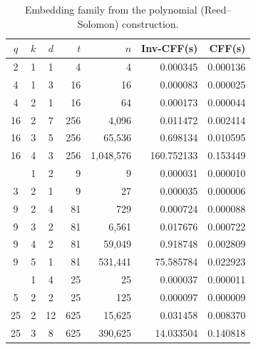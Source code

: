 
\begin{table}[htbp]
  \centering
  \begin{tabular}{cccrrrr}
  \toprule
  $q$ & $k$ & $d$ & $t$ & $n$ & \textbf{Inv-CFF(s)} & \textbf{CFF(s)} \\
  \midrule
  2 & 1 & 1 & 4 & 4 & 0.000345 & 0.000136 \\
  4 & 1 & 3 & 16 & 16 & 0.000083 & 0.000025 \\
  4 & 2 & 1 & 16 & 64 & 0.000173 & 0.000044 \\
  16 & 2 & 7 & 256 & 4{,}096 & 0.011472 & 0.002414 \\
  16 & 3 & 5 & 256 & 65{,}536 & 0.698134 & 0.010595 \\
  16 & 4 & 3 & 256 & 1{,}048{,}576 & 160.752133 & 0.153449 \\
  \addlinespace
  3 & 1 & 2 & 9 & 9 & 0.000031 & 0.000010 \\
  3 & 2 & 1 & 9 & 27 & 0.000035 & 0.000006 \\
  9 & 2 & 4 & 81 & 729 & 0.000724 & 0.000088 \\
  9 & 3 & 2 & 81 & 6{,}561 & 0.017676 & 0.000722 \\
  9 & 4 & 2 & 81 & 59{,}049 & 0.918748 & 0.002809 \\
  9 & 5 & 1 & 81 & 531{,}441 & 75.585784 & 0.022923 \\
  \addlinespace
  5 & 1 & 4 & 25 & 25 & 0.000037 & 0.000011 \\
  5 & 2 & 2 & 25 & 125 & 0.000097 & 0.000009 \\
  25 & 2 & 12 & 625 & 15{,}625 & 0.031458 & 0.008370 \\
  25 & 3 & 8 & 625 & 390{,}625 & 14.033504 & 0.140818 \\
  \bottomrule
  \end{tabular}
  \caption{Embedding family from the polynomial (Reed--Solomon) construction.}
  \label{tab:rs-embedding}
\end{table}

